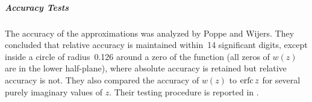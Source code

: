 \documentclass[twoside]{MATH77}
\begin{document}
%
\subparagraph{Accuracy Tests}

The accuracy of the approximations was analyzed by Poppe and Wijers. They
concluded that relative accuracy is maintained within~14 significant digits,
except inside a circle of radius~0.126 around a zero of the function (all
zeros of $w(z)$ are in the lower half-plane), where absolute accuracy is
retained but relative accuracy is not. They also compared the accuracy of $%
w(z)$ to $\erfc z$ for several purely imaginary values of $z$. Their testing
procedure is reported in \cite{Poppe:1990:MEC}.
\end{document}
